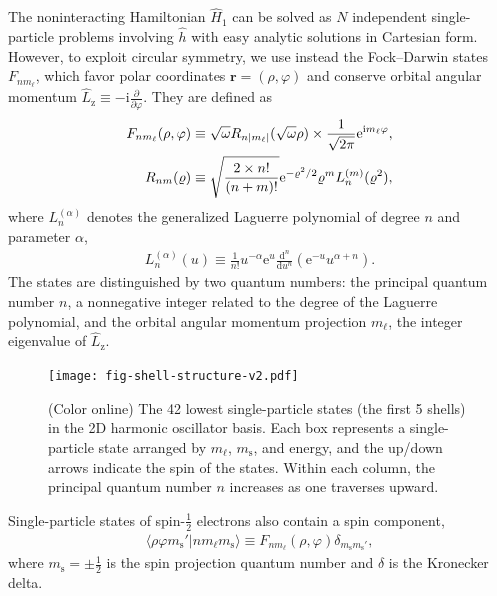 \documentclass[aip, jcp, 12pt]{revtex4-1}
\begin{document}
The noninteracting Hamiltonian $\hat{H}_1$ can be solved as $N$ independent single-particle problems involving $\hat{h}$ with easy analytic solutions in Cartesian form.  However, to exploit circular symmetry, we use instead the Fock--Darwin states $F_{n m_\ell}$, which favor polar coordinates $\bm{r} = (\rho, \varphi)$ and conserve orbital angular momentum $\hat{L}_{\mathrm{z}} \equiv -\mathrm{i} \frac{\partial}{\partial \varphi}$.  They are defined as\cite{lohne2010coupled}
\begin{align}
  F_{n m_\ell}(\rho, \varphi) &\equiv \sqrt\omega R_{n |m_\ell|}(\sqrt \omega \rho) \times \frac{1}{\sqrt{2 \pi}} \mathrm{e}^{\mathrm{i} m_\ell \varphi} \label{eq:fockdarwin}, \\
  R_{n m}(\varrho) &\equiv \sqrt{\frac{2 \times n!}{(n + m)!}} \mathrm{e}^{-\varrho^2 / 2} \varrho^m L_n^{(m)}(\varrho^2), \notag
\end{align}
where $L_n^{(\alpha)}$ denotes the generalized Laguerre polynomial \cite{NIST:DLMF} of degree $n$ and parameter $\alpha$,
\begin{align*}
  L_n^{(\alpha)}(u) \equiv \frac{1}{n!} u^{-\alpha} \mathrm{e}^u \frac{\mathrm{d}^n}{\mathrm{d} u^n} (\mathrm{e}^{-u} u^{\alpha + n}).
\end{align*}
The states are distinguished by two quantum numbers: the principal quantum number $n$, a nonnegative integer related to the degree of the Laguerre polynomial, and the orbital angular momentum projection $m_\ell$, the integer eigenvalue of $\hat{L}_{\mathrm{z}}$.

\begin{figure}
  \texttt{[image: fig-shell-structure-v2.pdf]}
  \caption{(Color online) The 42 lowest single-particle states (the first 5 shells) in the 2D harmonic oscillator basis.  Each box represents a single-particle state arranged by $m_\ell$, $m_{\mathrm{s}}$, and energy, and the up/down arrows indicate the spin of the states.  Within each column, the principal quantum number $n$ increases as one traverses upward.}
  \label{fig:shell-structure}
\end{figure}

Single-particle states of spin-$\frac{1}{2}$ electrons also contain a spin component,
\begin{align} \label{eq:singleparticlestate}
  \langle \rho \varphi m_{\mathrm{s}}' |n m_\ell m_{\mathrm{s}}\rangle \equiv F_{n m_\ell}(\rho, \varphi) \delta_{m_{\mathrm{s}}^{} m_{\mathrm{s}}'},
\end{align}
where $m_{\mathrm{s}} = \pm\frac{1}{2}$ is the spin projection quantum number and $\delta$ is the Kronecker delta.
\end{document}
